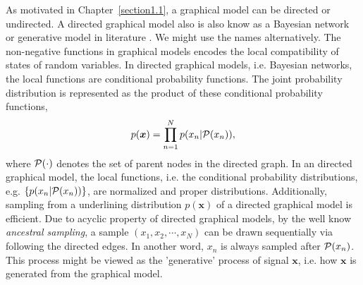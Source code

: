 As motivated in Chapter~\ref{section1.1}, a graphical model can be directed or undirected. A directed graphical model also is also know as a Bayesian network or generative model in literature \cite[Chapter~8]{Bishop:2006:PRM:1162264}. We might use the names alternatively. The non-negative functions in graphical models encodes the local compatibility of states of random variables. In directed graphical models, i.e. Bayesian networks, the local functions are conditional probability functions. The joint probability distribution is represented as the product of these conditional probability functions,
\begin{equation}
  p(\bm{x}) = \prod_{n=1}^{N}p(x_n| \mathcal{P}(x_n)),
\end{equation}
where $\mathcal{P}(\cdot)$ denotes the set of parent nodes in the directed graph. In an directed graphical model, the local functions, i.e. the conditional probability distributions, e.g. $\{p(x_n| \mathcal{P}(x_n))\}$, are normalized and proper distributions. Additionally, sampling from a underlining distribution $p(\bm{x})$ of a directed graphical model is efficient. Due to acyclic property of directed graphical models, by the well know \textit{ancestral sampling}, a sample $(x_1, x_2, \cdots, x_N)$ can be drawn sequentially via following the directed edges. In another word, $x_n$ is always sampled after $\mathcal{P}(x_n)$. This process might be viewed as the 'generative' process of signal $\bm{x}$, i.e. how $\bm{x}$ is generated from the graphical model.

